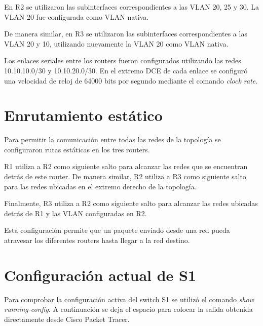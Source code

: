 \documentclass[12pt]{article}
\begin{document}
En R2 se utilizaron las subinterfaces correspondientes a las VLAN 20, 25 y
30. La VLAN 20 fue configurada como VLAN nativa.

De manera similar, en R3 se utilizaron las subinterfaces correspondientes a
las VLAN 20 y 10, utilizando nuevamente la VLAN 20 como VLAN nativa.

Los enlaces seriales entre los routers fueron configurados utilizando las
redes 10.10.10.0/30 y 10.10.20.0/30. En el extremo DCE de cada enlace se
configuró una velocidad de reloj de 64000 bits por segundo mediante el
comando \textit{clock rate}.


\section{Enrutamiento estático}

Para permitir la comunicación entre todas las redes de la topología se
configuraron rutas estáticas en los tres routers.

R1 utiliza a R2 como siguiente salto para alcanzar las redes que se encuentran
detrás de este router. De manera similar, R2 utiliza a R3 como siguiente salto
para las redes ubicadas en el extremo derecho de la topología.

Finalmente, R3 utiliza a R2 como siguiente salto para alcanzar las redes
ubicadas detrás de R1 y las VLAN configuradas en R2.

Esta configuración permite que un paquete enviado desde una red pueda
atravesar los diferentes routers hasta llegar a la red destino.


\section{Configuración actual de S1}

Para comprobar la configuración activa del switch S1 se utilizó el comando
\textit{show running-config}. A continuación se deja el espacio para colocar
la salida obtenida directamente desde Cisco Packet Tracer.
\end{document}

